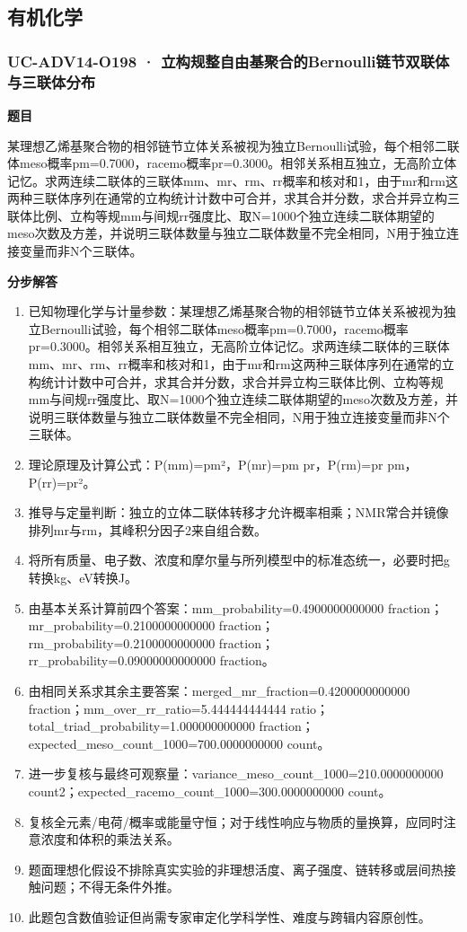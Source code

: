 \documentclass[UTF8,11pt,a4paper]{ctexart}
\begin{document}
\subsection*{有机化学}
\subsubsection*{UC-ADV14-O198 · 立构规整自由基聚合的Bernoulli链节双联体与三联体分布}
\noindent\textbf{题目}\par
某理想乙烯基聚合物的相邻链节立体关系被视为独立Bernoulli试验，每个相邻二联体meso概率pm=0.7000，racemo概率pr=0.3000。相邻关系相互独立，无高阶立体记忆。求两连续二联体的三联体mm、mr、rm、rr概率和核对和1，由于mr和rm这两种三联体序列在通常的立构统计计数中可合并，求其合并分数，求合并异立构三联体比例、立构等规mm与间规rr强度比、取N=1000个独立连续二联体期望的meso次数及方差，并说明三联体数量与独立二联体数量不完全相同，N用于独立连接变量而非N个三联体。\par
\medskip\noindent\textbf{分步解答}
\begin{enumerate}
\item 已知物理化学与计量参数：某理想乙烯基聚合物的相邻链节立体关系被视为独立Bernoulli试验，每个相邻二联体meso概率pm=0.7000，racemo概率pr=0.3000。相邻关系相互独立，无高阶立体记忆。求两连续二联体的三联体mm、mr、rm、rr概率和核对和1，由于mr和rm这两种三联体序列在通常的立构统计计数中可合并，求其合并分数，求合并异立构三联体比例、立构等规mm与间规rr强度比、取N=1000个独立连续二联体期望的meso次数及方差，并说明三联体数量与独立二联体数量不完全相同，N用于独立连接变量而非N个三联体。
\item 理论原理及计算公式：P(mm)=pm²，P(mr)=pm pr，P(rm)=pr pm，P(rr)=pr²。
\item 推导与定量判断：独立的立体二联体转移才允许概率相乘；NMR常合并镜像排列mr与rm，其峰积分因子2来自组合数。
\item 将所有质量、电子数、浓度和摩尔量与所列模型中的标准态统一，必要时把g转换kg、eV转换J。
\item 由基本关系计算前四个答案：mm\_probability=0.4900000000000 fraction；mr\_probability=0.2100000000000 fraction；rm\_probability=0.2100000000000 fraction；rr\_probability=0.09000000000000 fraction。
\item 由相同关系求其余主要答案：merged\_mr\_fraction=0.4200000000000 fraction；mm\_over\_rr\_ratio=5.444444444444 ratio；total\_triad\_probability=1.000000000000 fraction；expected\_meso\_count\_1000=700.0000000000 count。
\item 进一步复核与最终可观察量：variance\_meso\_count\_1000=210.0000000000 count2；expected\_racemo\_count\_1000=300.0000000000 count。
\item 复核全元素/电荷/概率或能量守恒；对于线性响应与物质的量换算，应同时注意浓度和体积的乘法关系。
\item 题面理想化假设不排除真实实验的非理想活度、离子强度、链转移或层间热接触问题；不得无条件外推。
\item 此题包含数值验证但尚需专家审定化学科学性、难度与跨辑内容原创性。
\end{enumerate}
\end{document}
